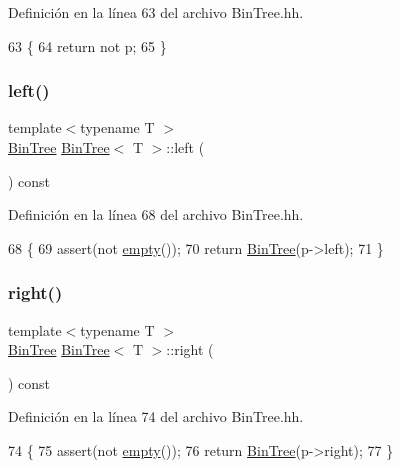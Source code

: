Definición en la línea 63 del archivo Bin\+Tree.\+hh.


\begin{DoxyCode}
63                         \{
64         \textcolor{keywordflow}{return} not p;
65     \}
\end{DoxyCode}
\mbox{\label{class_bin_tree_a82108db4c1b08d1f111027788c196d4e}} 
\subsubsection{\texorpdfstring{left()}{left()}}
{\footnotesize\ttfamily template$<$typename T $>$ \\
\mbox{\hyperlink{class_bin_tree}{Bin\+Tree}} \mbox{\hyperlink{class_bin_tree}{Bin\+Tree}}$<$ T $>$\+::left (\begin{DoxyParamCaption}{ }\end{DoxyParamCaption}) const}



Definición en la línea 68 del archivo Bin\+Tree.\+hh.


\begin{DoxyCode}
68                           \{
69         assert(not \mbox{\hyperlink{class_bin_tree_a74cda259ba5c25b8ee38ed4dc33e4fad}{empty}}());
70         \textcolor{keywordflow}{return} \mbox{\hyperlink{class_bin_tree_a47eef22d29cd023449d97c073c08e5b6}{BinTree}}(p->left);
71     \}
\end{DoxyCode}
\mbox{\label{class_bin_tree_aff8e96651b27284c329667b5ad3e4d0b}} 
\subsubsection{\texorpdfstring{right()}{right()}}
{\footnotesize\ttfamily template$<$typename T $>$ \\
\mbox{\hyperlink{class_bin_tree}{Bin\+Tree}} \mbox{\hyperlink{class_bin_tree}{Bin\+Tree}}$<$ T $>$\+::right (\begin{DoxyParamCaption}{ }\end{DoxyParamCaption}) const}



Definición en la línea 74 del archivo Bin\+Tree.\+hh.


\begin{DoxyCode}
74                            \{
75         assert(not \mbox{\hyperlink{class_bin_tree_a74cda259ba5c25b8ee38ed4dc33e4fad}{empty}}());
76         \textcolor{keywordflow}{return} \mbox{\hyperlink{class_bin_tree_a47eef22d29cd023449d97c073c08e5b6}{BinTree}}(p->right);
77     \}
\end{DoxyCode}
\mbox{\label{class_bin_tree_a734e785b089c87b49187ee7c58edf5f3}} 
